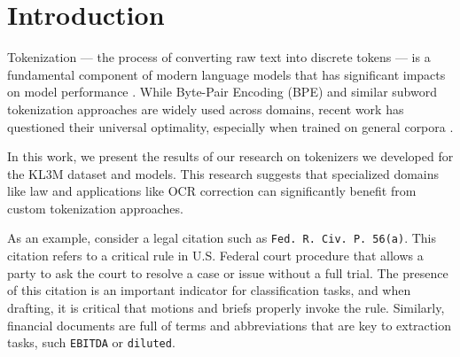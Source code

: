 \section{Introduction}

Tokenization — the process of converting raw text into discrete tokens — is a fundamental component of modern language models \cite{brown2020language, chowdhery2023palm} that has significant impacts on model performance \cite{rust2020good}. While Byte-Pair Encoding (BPE) \cite{sennrich2016neural, gage1994new} and similar subword tokenization approaches are widely used across domains, recent work has questioned their universal optimality, especially when trained on general corpora \cite{bostrom2020byte}.

In this work, we present the results of our research on tokenizers we developed for the KL3M dataset and models.  This research suggests that specialized domains like law and applications like OCR correction can significantly benefit from custom tokenization approaches.

As an example, consider a legal citation such as \texttt{Fed. R. Civ. P. 56(a)}.  This citation refers to a critical rule in U.S. Federal court procedure that allows a party to ask the court to resolve a case or issue without a full trial.  The presence of this citation is an important indicator for classification tasks, and when drafting, it is critical that motions and briefs properly invoke the rule.  Similarly, financial documents are full of terms and abbreviations that are key to extraction tasks, such \texttt{EBITDA} or \texttt{diluted}.

